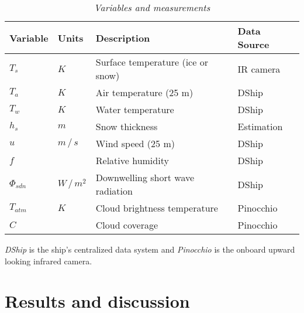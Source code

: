 \documentclass[a4paper,12pt]{article}
\begin{document}
\begin{table}[h]
    \caption{\em Variables and measurements}\vspace{5pt}
    \label{tab:param_vars}
    \centering
    \begin{tabular}{llll}
        Variable      & Units       & Description                             & Data Source\\
        \hline                                                                                              
		$T_s$         & $K$         & Surface temperature (ice or snow)       & IR camera  \\
		$T_a$         & $K$         & Air temperature (25 m)                  & DShip      \\
		$T_w$         & $K$         & Water temperature                       & DShip      \\
		$h_s$         & $m$         & Snow thickness                          & Estimation \\
		$u$           & $m\,/\,s$   & Wind speed (25 m)                       & DShip      \\ 
		$f$           &             & Relative humidity                       & DShip      \\
		$\Phi_{sdn}$  & $W\,/\,m^2$ & Downwelling short wave radiation        & DShip      \\
		$T_{atm}$     & $K$         & Cloud brightness temperature            & Pinocchio  \\
		$C$           &             & Cloud coverage                          & Pinocchio  \\
        \hline
    \end{tabular}
	\begin{flushleft}
	\emph{DShip} is the ship's centralized data system and \emph{Pinocchio} is the onboard upward looking infrared camera.
	\end{flushleft}
\end{table}

\section{Results and discussion}


\end{document}
